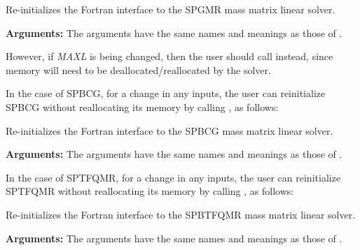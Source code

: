 \documentclass[letterpaper,10pt,english]{sphinxmanual}
\begin{document}
\begin{fulllineitems}
\label{f_interface/Usage:f/_/FARKMASSSPGMRREINIT}
Re-initializes the Fortran interface to the SPGMR mass matrix
linear solver.

\textbf{Arguments:}  The arguments have the same names and meanings as
those of {\hyperref[f_interface/Usage:f/_/FARKMASSSPGMR]{\emph{}}}.

\end{fulllineitems}


However, if \emph{MAXL} is being changed, then the user should call
{\hyperref[f_interface/Usage:f/_/FARKMASSSPGMR]{\emph{}}} instead, since memory will need to be
deallocated/reallocated by the solver.

In the case of SPBCG, for a change in any inputs, the user can
reinitialize SPBCG without reallocating its memory by calling
{\hyperref[f_interface/Usage:f/_/FARKMASSSPBCGREINIT]{\emph{}}}, as follows:

\begin{fulllineitems}
\label{f_interface/Usage:f/_/FARKMASSSPBCGREINIT}
Re-initializes the Fortran interface to the SPBCG mass matrix
linear solver.

\textbf{Arguments:}  The arguments have the same names and meanings as
those of {\hyperref[f_interface/Usage:f/_/FARKMASSSPBCG]{\emph{}}}.

\end{fulllineitems}


In the case of SPTFQMR, for a change in any inputs, the user can
reinitialize SPTFQMR without reallocating its memory by calling
{\hyperref[f_interface/Usage:f/_/FARKMASSSPTFQMRREINIT]{\emph{}}}, as follows:

\begin{fulllineitems}
\label{f_interface/Usage:f/_/FARKMASSSPTFQMRREINIT}
Re-initializes the Fortran interface to the SPBTFQMR mass matrix
linear solver.

\textbf{Arguments:}  The arguments have the same names and meanings as
those of {\hyperref[f_interface/Usage:f/_/FARKMASSSPTFQMR]{\emph{}}}.

\end{fulllineitems}
\end{document}
